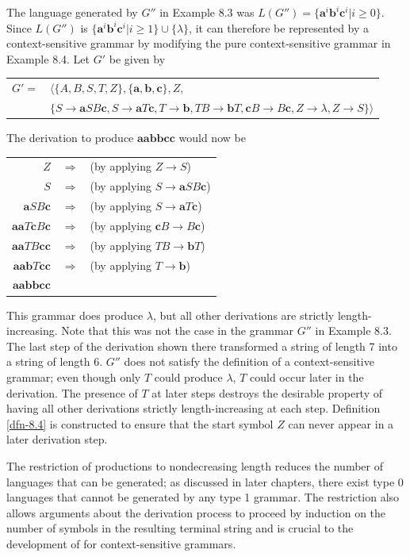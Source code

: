 The language generated by $G''$ in Example 8.3 was $L(G'')=\{\pmb{a}^i\pmb{b}^i
\pmb{c}^i|i \geq 0\}$. Since $L(G'')$ is $\{\pmb{a}^i\pmb{b}^i\pmb{c}^i|i\geq
1\}\cup\{\lambda\}$, it can therefore be represented by a context-sensitive
grammar by modifying the pure context-sensitive grammar in Example 8.4. Let $G'$
be given by
\begin{center}\begin{tabular}{r@{ }l}
$G' =$ & $\langle\{A,B,S,T,Z\},\{\pmb{a},\pmb{b},\pmb{c}\},Z,$ \\
& $\{S\rightarrow\pmb{a}SB\pmb{c},S\rightarrow\pmb{a}T\pmb{c},T\rightarrow\pmb{b},
	TB\rightarrow\pmb{b}T,\pmb{c}B\rightarrow B\pmb{c},Z\rightarrow\lambda,
	Z \rightarrow S\}\rangle$
\end{tabular}\end{center}
The derivation to produce $\pmb{aabbcc}$ would now be
\begin{center}\begin{tabular}{r@{ }c@{ }l@{ }}
$Z$ & $\Rightarrow$ & (by applying $Z \rightarrow S$) \\
$S$ & $\Rightarrow$ & (by applying $S \rightarrow \pmb{a}SB\pmb{c}$) \\
$\pmb{a}SB\pmb{c}$ & $\Rightarrow$ & (by applying $S \rightarrow \pmb{a}T\pmb{c}$) \\
$\pmb{aa}T\pmb{c}B\pmb{c}$ & $\Rightarrow$ & (by applying $\pmb{c}B \rightarrow
	B\pmb{c}$) \\
$\pmb{aa}TB\pmb{cc}$ & $\Rightarrow$ & (by applying $TB \rightarrow \pmb{b}T$) \\
$\pmb{aab}T\pmb{cc}$ & $\Rightarrow$ & (by applying $T \rightarrow \pmb{b}$) \\
$\pmb{aabbcc}$
\end{tabular}\end{center}
This grammar does produce $\lambda$, but all other derivations are strictly
length-increasing. Note that this was not the case in the grammar $G''$ in
Example 8.3. The last step of the derivation shown there transformed a string of
length 7 into a string of length 6. $G''$ does not satisfy the definition of a
context-sensitive grammar; even though only $T$ could produce $\lambda$, $T$
could occur later in the derivation. The presence of $T$ at later steps destroys
the desirable property of having all other derivations strictly length-increasing
at each step. Definition \ref{dfn-8.4} is constructed to ensure that the start symbol $Z$
can never appear in a later derivation step.

The restriction of productions to nondecreasing length reduces the number of
languages that can be generated; as discussed in later chapters, there exist
type 0 languages that cannot be generated by any type 1 grammar. The restriction
also allows arguments about the derivation process to proceed by induction on
the number of symbols in the resulting terminal string and is crucial to the
development of \emph{} for context-sensitive grammars.

